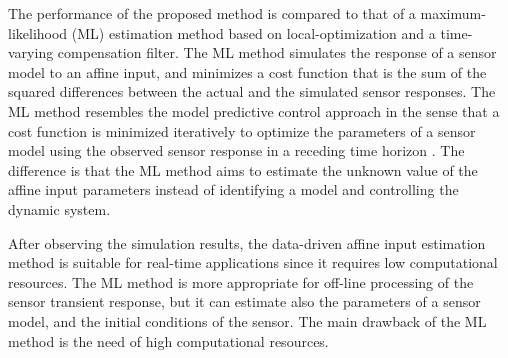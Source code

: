 The performance of the proposed method is compared to that of a maximum-likelihood (ML) estimation method based on local-optimization and a time-varying compensation filter.
The ML method simulates the response of a sensor model to an affine input, and minimizes a cost function that is the sum of the squared differences between the actual and the simulated sensor responses. 
The ML method resembles the model predictive control approach in the sense that a cost function is minimized iteratively to optimize the parameters of a sensor model using the observed sensor response in a receding time horizon \citep{Mayne14}.
The difference is that the ML method aims to estimate the unknown value of the affine input parameters instead of identifying a model and controlling the dynamic system. 
 
After observing the simulation results, the data-driven affine input estimation method is suitable for real-time applications since it requires low computational resources. 
The ML method is more appropriate for off-line processing of the sensor transient response, but
it can estimate also the parameters of a sensor model, and the initial conditions of the sensor.
The main drawback of the ML method is the need of high computational resources.


 
